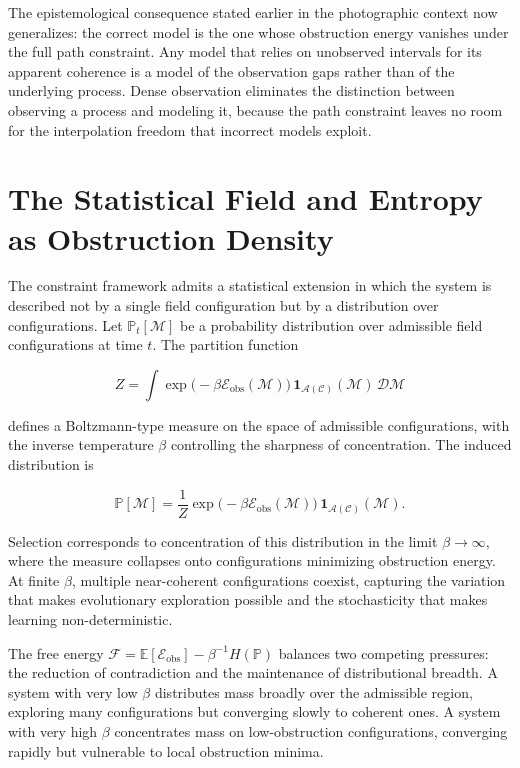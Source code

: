 \documentclass[12pt, a4paper, oneside]{article}
\theoremstyle{plain}
\theoremstyle{definition}
\theoremstyle{remark}
\newcommand{\C}{\mathcal{C}}
\newcommand{\A}{\mathcal{A}}
\begin{document}
The epistemological consequence stated earlier in the photographic context now generalizes: the correct model is the one whose obstruction energy vanishes under the full path constraint. Any model that relies on unobserved intervals for its apparent coherence is a model of the observation gaps rather than of the underlying process. Dense observation eliminates the distinction between observing a process and modeling it, because the path constraint leaves no room for the interpolation freedom that incorrect models exploit.

\section{The Statistical Field and Entropy as Obstruction Density}

The constraint framework admits a statistical extension in which the system is described not by a single field configuration but by a distribution over configurations. Let $\mathbb{P}_t[\mathcal{M}]$ be a probability distribution over admissible field configurations at time $t$. The partition function

\begin{equation}
Z = \int \exp\!\big(-\beta \mathcal{E}_{\mathrm{obs}}(\mathcal{M})\big)\, \mathbf{1}_{\A(\C)}(\mathcal{M})\, \mathcal{D}\mathcal{M}
\end{equation}

defines a Boltzmann-type measure on the space of admissible configurations, with the inverse temperature $\beta$ controlling the sharpness of concentration. The induced distribution is

\begin{equation}
\mathbb{P}[\mathcal{M}] = \frac{1}{Z} \exp\!\big(-\beta \mathcal{E}_{\mathrm{obs}}(\mathcal{M})\big)\, \mathbf{1}_{\A(\C)}(\mathcal{M}).
\end{equation}

Selection corresponds to concentration of this distribution in the limit $\beta \to \infty$, where the measure collapses onto configurations minimizing obstruction energy. At finite $\beta$, multiple near-coherent configurations coexist, capturing the variation that makes evolutionary exploration possible and the stochasticity that makes learning non-deterministic.

The free energy $\mathcal{F} = \mathbb{E}[\mathcal{E}_{\mathrm{obs}}] - \beta^{-1} H(\mathbb{P})$ balances two competing pressures: the reduction of contradiction and the maintenance of distributional breadth. A system with very low $\beta$ distributes mass broadly over the admissible region, exploring many configurations but converging slowly to coherent ones. A system with very high $\beta$ concentrates mass on low-obstruction configurations, converging rapidly but vulnerable to local obstruction minima.
\end{document}
